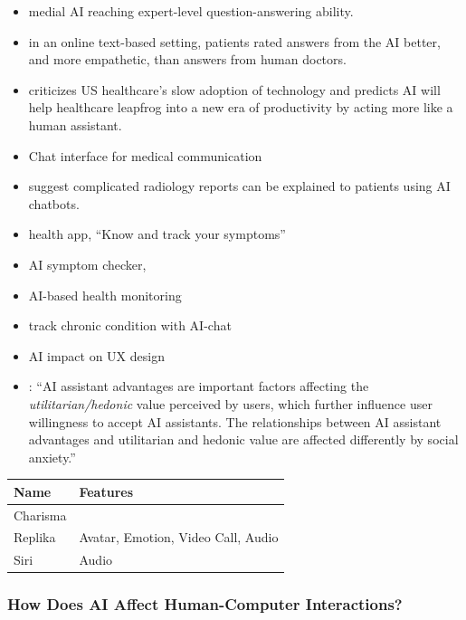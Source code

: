 \documentclass[
  letterpaper,
  DIV=11,
  numbers=noendperiod]{scrartcl}
\begin{document}
\begin{itemize}
\item
  \citet{singhalExpertLevelMedicalQuestion2023} medial AI reaching
  expert-level question-answering ability.
\item
  \citet{ayersComparingPhysicianArtificial2023} in an online text-based
  setting, patients rated answers from the AI better, and more
  empathetic, than answers from human doctors.
\item
  \citet{daisywolfWhereWillAI2023} criticizes US healthcare's slow
  adoption of technology and predicts AI will help healthcare leapfrog
  into a new era of productivity by acting more like a human assistant.
\item
  \citet{elizastricklandDrChatGPTWill2023} Chat interface for medical
  communication
\item
  \citet{jeblickChatGPTMakesMedicine2022} suggest complicated radiology
  reports can be explained to patients using AI chatbots.
\item
  \citet{HealthPoweredAda} health app, ``Know and track your symptoms''
\item
  \citet{BuoyHealthCheck} AI symptom checker,
\item
  \citet{womeninaiHowCanAI} AI-based health monitoring
\item
  \citet{HomeLarkHealth} track chronic condition with AI-chat
\item
  \citet{stephaniedonaholeHowArtificialIntelligence2021} AI impact on UX
  design
\item
  \citet{yuanSocialAnxietyModerator2022}: ``AI assistant advantages are
  important factors affecting the \emph{utilitarian/hedonic} value
  perceived by users, which further influence user willingness to accept
  AI assistants. The relationships between AI assistant advantages and
  utilitarian and hedonic value are affected differently by social
  anxiety.''
\end{itemize}

\begin{longtable}[]{@{}ll@{}}
\toprule\noalign{}
Name & Features \\
\midrule\noalign{}
\endhead
\bottomrule\noalign{}
\endlastfoot
Charisma & \\
Replika & Avatar, Emotion, Video Call, Audio \\
Siri & Audio \\
\end{longtable}

\subsubsection{How Does AI Affect Human-Computer
Interactions?}\label{how-does-ai-affect-human-computer-interactions}
\end{document}
